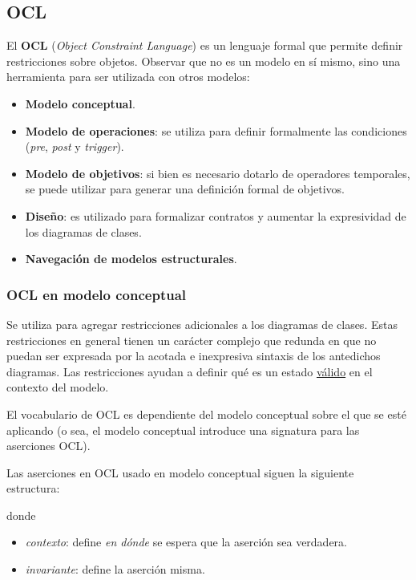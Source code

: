 \documentclass[]{article}
\begin{document}
\subsection{OCL}
El \textbf{OCL} (\textit{Object Constraint Language}) es un lenguaje formal que permite definir restricciones sobre objetos. Observar que no es un modelo en sí mismo, sino una herramienta para ser utilizada con otros modelos:
\begin{itemize}
	\item \textbf{Modelo conceptual}.
	\item \textbf{Modelo de operaciones}: se utiliza para definir formalmente las condiciones (\textit{pre}, \textit{post} y \textit{trigger}).
	\item \textbf{Modelo de objetivos}: si bien es necesario dotarlo de operadores temporales, se puede utilizar para generar una definición formal de objetivos.
	\item \textbf{Diseño}: es utilizado para formalizar contratos y aumentar la expresividad de los diagramas de clases.
	\item \textbf{Navegación de modelos estructurales}.
\end{itemize}

\subsubsection{OCL en modelo conceptual}
Se utiliza para agregar restricciones adicionales a los diagramas de clases. Estas restricciones en general tienen un carácter complejo que redunda en que no puedan ser expresada por la acotada e inexpresiva sintaxis de los antedichos diagramas. Las restricciones ayudan a definir qué es un estado \underline{válido} en el contexto del modelo.

El vocabulario de OCL es dependiente del modelo conceptual sobre el que se esté aplicando (o sea, el modelo conceptual introduce una signatura para las aserciones OCL).

Las aserciones en OCL usado en modelo conceptual siguen la siguiente estructura:
\begin{center}
\end{center}
donde

\begin{itemize}
	\item \textit{contexto}: define \textit{en dónde} se espera que la aserción sea verdadera.
	\item \textit{invariante}: define la aserción misma.
\end{itemize}
\end{document}
